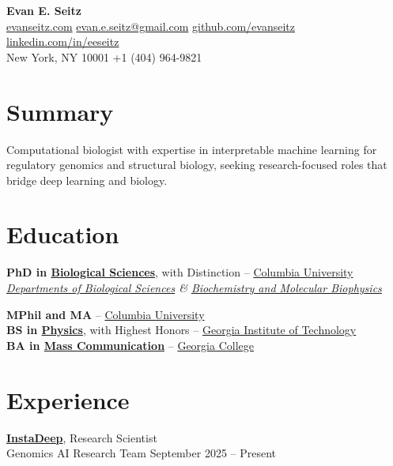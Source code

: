 \documentclass[11pt]{article}
\begin{document}
\begin{center}
    {\LARGE \textbf{Evan E. Seitz}}\\[0.5em]
    \href{https://www.evanseitz.com}{evanseitz.com} \quad
    \href{mailto:evan.e.seitz@gmail.com}{evan.e.seitz@gmail.com} \quad
    \href{https://github.com/evanseitz}{github.com/evanseitz} \quad
    \href{https://www.linkedin.com/in/eeseitz}{linkedin.com/in/eeseitz}\\[0.3em]
    New York, NY 10001 \quad +1 (404) 964-9821
\end{center}


\section*{\textcolor{Mahogany}{Summary}}
{\small
Computational biologist with expertise in interpretable machine learning for regulatory genomics and structural biology, seeking research-focused roles that bridge deep learning and biology.
}

\section*{\textcolor{Mahogany}{Education}}
{\small
\textbf{PhD in \href{https://biology.columbia.edu/}{Biological Sciences}}, with Distinction – \href{https://www.columbia.edu/}{Columbia University}\\
\textit{\href{https://biology.columbia.edu/}{Departments of Biological Sciences} \& \href{https://www.biochem.cuimc.columbia.edu/}{Biochemistry and Molecular Biophysics}}

\textbf{MPhil and MA} – \href{https://www.columbia.edu/}{Columbia University}\\
\textbf{BS in \href{https://physics.gatech.edu/}{Physics}}, with Highest Honors – \href{https://www.gatech.edu/}{Georgia Institute of Technology}\\
\textbf{BA in \href{https://www.gcsu.edu/artsandsciences/communication/mass-communication-ba}{Mass Communication}} – \href{https://www.gcsu.edu/}{Georgia College}
}

\section*{\textcolor{Mahogany}{Experience}}

\textbf{\href{https://instadeep.com/}{InstaDeep}}, Research Scientist\\
Genomics AI Research Team \hfill September 2025 – Present
\end{document}
